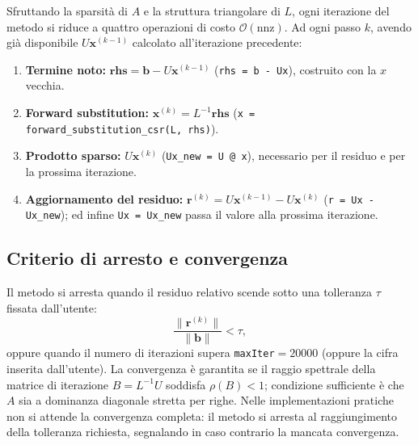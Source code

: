 \documentclass[a4paper, 12pt]{report}
\begin{document}
Sfruttando la sparsità di $A$ e la struttura triangolare di $L$, ogni
iterazione del metodo si riduce a quattro operazioni di costo
$\mathcal{O}(\mathrm{nnz})$. Ad ogni passo $k$, avendo già disponibile
$U\mathbf{x}^{(k-1)}$ calcolato all'iterazione precedente:
\begin{enumerate}
    \item \textbf{Termine noto:}
          $\mathbf{rhs} = \mathbf{b} - U\mathbf{x}^{(k-1)}$\quad
          (\texttt{rhs = b - Ux}),
          costruito con la $x$ vecchia.
    \item \textbf{Forward substitution:}
          $\mathbf{x}^{(k)} = L^{-1}\mathbf{rhs}$\quad
          (\texttt{x = forward\_substitution\_csr(L, rhs)}).
    \item \textbf{Prodotto sparso:}
          $U\mathbf{x}^{(k)}$\quad
          (\texttt{Ux\_new = U @ x}),
          necessario per il residuo e per la prossima iterazione.
    \item \textbf{Aggiornamento del residuo:}
          $\mathbf{r}^{(k)} = U\mathbf{x}^{(k-1)} - U\mathbf{x}^{(k)}$
          \quad(\texttt{r = Ux - Ux\_new}); ed infine
          \texttt{Ux = Ux\_new} passa il valore alla prossima
          iterazione.
\end{enumerate}

\subsection*{Criterio di arresto e convergenza}

Il metodo si arresta quando il residuo relativo scende sotto una
tolleranza $\tau$ fissata dall'utente:
\[
    \frac{\|\mathbf{r}^{(k)}\|}{\|\mathbf{b}\|} < \tau,
\]
oppure quando il numero di iterazioni supera
\texttt{maxIter}$= 20000$ (oppure la cifra inserita dall'utente).
La convergenza è garantita se il raggio spettrale della matrice di
iterazione $B = L^{-1}U$ soddisfa $\rho(B) < 1$; condizione
sufficiente è che $A$ sia a dominanza diagonale stretta per righe.
Nelle implementazioni pratiche non si attende la convergenza completa:
il metodo si arresta al raggiungimento della tolleranza richiesta,
segnalando in caso contrario la mancata convergenza.
\end{document}
